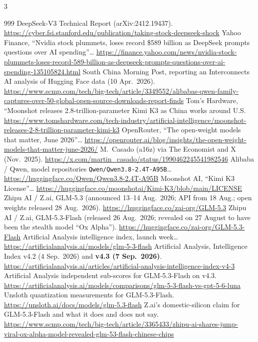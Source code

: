 \begin{multicols}{3}
\begin{thebibliography}{999}
 DeepSeek-V3 Technical Report (arXiv:2412.19437). \url{https://cyber.fsi.stanford.edu/publication/taking-stock-deepseek-shock}
 Yahoo Finance, ``Nvidia stock plummets, loses record \$589 billion as DeepSeek prompts questions over AI spending''… \url{https://finance.yahoo.com/news/nvidia-stock-plummets-loses-record-589-billion-as-deepseek-prompts-questions-over-ai-spending-135105824.html}
 South China Morning Post, reporting an Interconnects AI analysis of Hugging Face data (10 Apr.\ 2026). \url{https://www.scmp.com/tech/big-tech/article/3349552/alibabas-qwen-family-captures-over-50-global-open-source-downloads-report-finds}
 Tom's Hardware, ``Moonshot releases 2.8-trillion-parameter Kimi K3 as China works around U.S. \url{https://www.tomshardware.com/tech-industry/artificial-intelligence/moonshot-releases-2-8-trillion-parameter-kimi-k3}
 OpenRouter, ``The open-weight models that matter, June 2026''… \url{https://openrouter.ai/blog/insights/the-open-weight-models-that-matter-june-2026/}
 M.~Casado (a16z) via The Economist and X (Nov.\ 2025). \url{https://x.com/martin_casado/status/1990462245541982546}
 Alibaba / Qwen, model repositories \texttt{Qwen/Qwen3.8-2.4T-A95B}… \url{https://huggingface.co/Qwen/Qwen3.8-2.4T-A95B}
 Moonshot AI, ``Kimi K3 License''… \url{https://huggingface.co/moonshotai/Kimi-K3/blob/main/LICENSE}
 Zhipu AI / Z.ai, GLM-5.3 (announced 13--14 Aug.\ 2026; API from 18 Aug.; open weights released 28 Aug.\ 2026). \url{https://huggingface.co/zai-org/GLM-5.3}
 Zhipu AI / Z.ai, GLM-5.3-Flash (released 26 Aug.\ 2026; revealed on 27 August to have been the stealth model ``Ox Alpha''). \url{https://huggingface.co/zai-org/GLM-5.3-Flash}
 Artificial Analysis intelligence index, launch week… \url{https://artificialanalysis.ai/models/glm-5-3-flash}
 Artificial Analysis, Intelligence Index v4.2 (4 Sep.\ 2026) and \textbf{v4.3 (7 Sep.\ 2026)}. \url{https://artificialanalysis.ai/articles/artificial-analysis-intelligence-index-v4-3}
 Artificial Analysis independent sub-scores for GLM-5.3-Flash on v4.3. \url{https://artificialanalysis.ai/models/comparisons/glm-5-3-flash-vs-gpt-5-6-luna}
 Unsloth quantization measurements for GLM-5.3-Flash. \url{https://unsloth.ai/docs/models/glm-5.3-flash}
 Z.ai's domestic-silicon claim for GLM-5.3-Flash and what it does and does not say. \url{https://www.scmp.com/tech/big-tech/article/3365433/zhipu-ai-shares-jump-viral-ox-alpha-model-revealed-glm-53-flash-chinese-chips}

\end{thebibliography}
\end{multicols}
